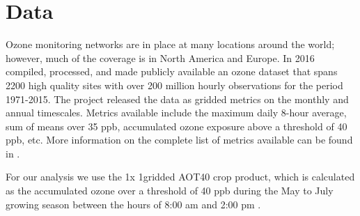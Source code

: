 \documentclass[10pt]{amsart}
\begin{document}
\section{Data}
Ozone monitoring networks are in place at many locations around the world; however, much of the coverage is in North America and Europe. 
In 2016 \cite{sofen:2016aa} compiled, processed, and made publicly available an ozone dataset that spans 2200 high quality sites with over 200 million hourly observations for the period 1971-2015.
The project released the data as gridded metrics on the monthly and annual timescales.
Metrics available include the maximum daily 8-hour average, sum of means over 35 ppb, accumulated ozone exposure above a threshold of 40 ppb, etc. 
More information on the complete list of metrics available can be found in \cite{sofen:2016aa}.

For our analysis we use the 1\degree x 1\degree gridded AOT40 crop product, which is calculated as the accumulated ozone over a threshold of 40 ppb during the May to July growing season between the hours of 8:00 am and 2:00 pm \parencite{sofen:2016aa}.


 

\printbibliography
\end{document}
